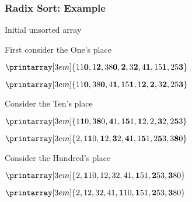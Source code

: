 \documentclass[newPxFont,sthlmFooter,nooffset]{beamer}
\begin{document}
\begin{frame}[t]
  \frametitle{Radix Sort: Example}

Initial unsorted array

  \begin{center}
  \end{center}

First consider the One's place
  \begin{center}
$    \printarray[3em]{11\mathbf{0}, 1\mathbf{2}, 38\mathbf{0}, \mathbf{2}, 3\mathbf{2}, 4\mathbf{1}, 15\mathbf{1}, 25\mathbf{3}}$

$    \printarray[3em]{11\mathbf{0}, 38\mathbf{0}, 4\mathbf{1},  15\mathbf{1}, 1\mathbf{2}, \mathbf{2}, 3\mathbf{2},  25\mathbf{3}}$

  \end{center}

Consider the Ten's place
  \begin{center}
$    \printarray[3em]{1\mathbf{1}0, 3\mathbf{8}0, \mathbf{4}1, 1\mathbf{5}1, \mathbf{1}2,  2, \mathbf{3}2,   2\mathbf{5}3}$

$    \printarray[3em]{2, 1\mathbf{1}0, \mathbf{1}2, \mathbf{3}2,  \mathbf{4}1, 1\mathbf{5}1,      2\mathbf{5}3, 3\mathbf{8}0}$

  \end{center}

Consider the Hundred's place
  \begin{center}
$    \printarray[3em]{2, \mathbf{1}10, 12, 32,  41, \mathbf{1}51,      \mathbf{2}53, \mathbf{3}80}$

$    \printarray[3em]{2,  12, 32,  41, \mathbf{1}10, \mathbf{1}51,      \mathbf{2}53, \mathbf{3}80}$

  \end{center}


\end{frame}
\end{document}
